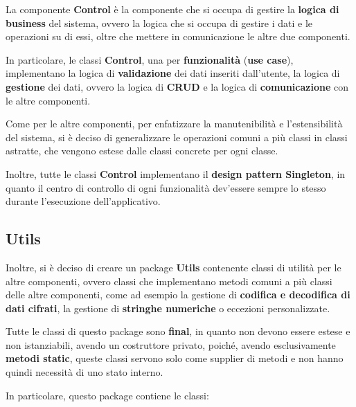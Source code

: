 La componente \textbf{Control} è la componente che si occupa di gestire la \textbf{logica di
business} del sistema, ovvero la logica che si occupa di gestire i dati e le operazioni
su di essi, oltre che mettere in comunicazione le altre due componenti.

In particolare, le classi \textbf{Control}, una per \textbf{funzionalità} (\textbf{use case}),
implementano la logica di \textbf{validazione} dei dati inseriti dall'utente, 
la logica di \textbf{gestione} dei dati, ovvero la logica di \textbf{CRUD} e 
la logica di \textbf{comunicazione} con le altre componenti.

Come per le altre componenti, per enfatizzare la manutenibilità e l'estensibilità del sistema,
si è deciso di generalizzare le operazioni comuni a più classi in classi astratte, che
vengono estese dalle classi concrete per ogni classe.

Inoltre, tutte le classi \textbf{Control} implementano il \textbf{design pattern Singleton},
in quanto il centro di controllo di ogni funzionalità dev'essere sempre lo stesso durante
l'esecuzione dell'applicativo.



\subsection{Utils}

Inoltre, si è deciso di creare un package \textbf{Utils} contenente classi di utilità
per le altre componenti, ovvero classi che implementano metodi comuni a più classi
delle altre componenti, come ad esempio la gestione di \textbf{codifica e decodifica di dati
cifrati}, la gestione di \textbf{stringhe numeriche} o eccezioni personalizzate.

Tutte le classi di questo package sono \textbf{final}, in quanto non devono essere estese
e non istanziabili, avendo un costruttore privato, poiché, avendo esclusivamente 
\textbf{metodi static}, queste classi servono solo come supplier di metodi e non hanno
quindi necessità di uno stato interno.

In particolare, questo package contiene le classi:

